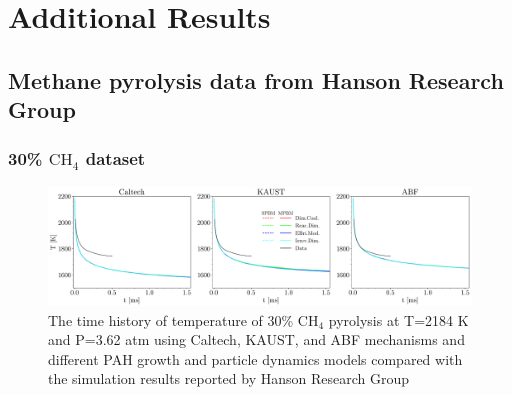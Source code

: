 \chapter{Additional Results}
\label{apps:addresults}

\section{Methane pyrolysis data from Hanson Research Group}

\subsection{30\% $\mathrm{CH_4}$ dataset}

\begin{figure}[H]
	\centering
	\includegraphics[width=1\textwidth]{Figures/Results/Shocktube/Stanford/june/stsh_mech_compare_T.pdf}
	\caption{The time history of temperature of 30\% $\mathrm{CH_4}$ pyrolysis at T=2184 K and P=3.62 atm using Caltech, KAUST, and ABF mechanisms and different PAH growth and particle dynamics models compared with the simulation results reported by Hanson Research Group}
	\label{fig:shocktubestT} 
\end{figure}


